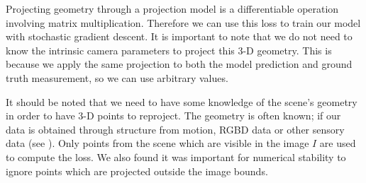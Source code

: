Projecting geometry through a projection model is a differentiable operation involving matrix multiplication. Therefore we can use this loss to train our model with stochastic gradient descent. It is important to note that we do not need to know the intrinsic camera parameters to project this 3-D geometry. This is because we apply the same projection to both the model prediction and ground truth measurement, so we can use arbitrary values.

It should be noted that we need to have some knowledge of the scene's geometry in order to have 3-D points to reproject. The geometry is often known; if our data is obtained through structure from motion, RGBD data or other sensory data (see ). Only points from the scene which are visible in the image $I$ are used to compute the loss. We also found it was important for numerical stability to ignore points which are projected outside the image bounds.

